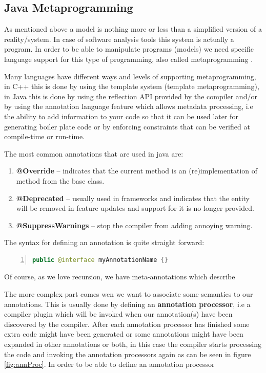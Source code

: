 		
\subsection{Java Metaprogramming}

	
	As mentioned above a model is nothing more or less than a simplified version of
a reality/system. In case of software analysis tools this system is actually a
program. In order to be able to manipulate programs (models) we need specific
language support for this type of programming, also called metaprogramming
\cite{website:metaprogramming}. 

	Many languages have different ways and levels of supporting metaprogramming,
in C++ this is done by using the template system (template metaprogramming), in
Java this is done by using the reflection API provided by the compiler and/or by using the annotation
language feature which allows metadata processing, i.e the ability to add
information to your code so that it can be used later for generating boiler
plate code or by enforcing constraints that can be verified at compile-time or
run-time. \cite{book:ThinkingInJava} 
	
	The most common annotations that are used in java are:
	\begin{enumerate}
	  \item \textbf{@Override} -- indicates that the current method is an
 (re)implementation of method from the base class.
  
	  \item \textbf{@Deprecated} -- usually used in frameworks and indicates that
	  the entity will be removed in feature updates and support for it is no longer
 provided.
 
	  \item \textbf{@SuppressWarnings} -- stop the compiler from adding annoying
 warning.
	\end{enumerate}
	
	The syntax for defining an annotation is quite straight forward:
	\small
	\begin{lstlisting}[language=Java,numbers=left]
		public @interface myAnnotationName {}
	\end{lstlisting}
	\normalsize{}
	Of course, as we love recursion, we have meta-annotations which describe
	
	The more complex part comes wen we want to associate some semantics to our
annotations. This is usually done by defining an \textbf{annotation processor},
i.e a compiler plugin which will be invoked when our annotation(s) have been
discovered by the compiler. After each annotation processor has finished some
extra code might have been generated or some annotations might have been
expanded in other annotations or both, in this case the compiler starts
processing the code and invoking the annotation processors again as can be
seen in figure \ref{fig:annProc}.
	 In order to be able to define an annotation processor
	
